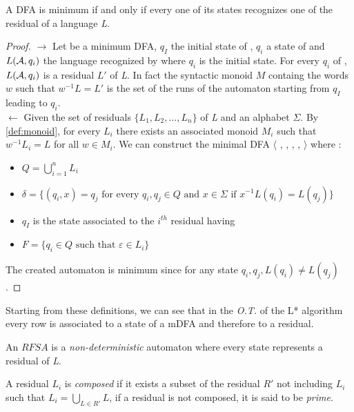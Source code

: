 \begin{theorem}
  A DFA is minimum if and only if every one of its states recognizes one of the residual of a language \textit{L}.
\end{theorem}

\begin{proof}
  $\rightarrow$ Let \automaton{} be a minimum DFA, $q_I$ the initial state of \automaton{}, $q_i$ a state of \automaton{} and $L(\mathcal{A}{}, q_i)$ the language recognized by \automaton{} where $q_i$ is the initial state. For every $q_i$ of \automaton{}, $L(\mathcal{A}{}, q_i)$ is a residual $L'$ of \textit{L}. In fact the syntactic monoid $M$ containg the words $w$ such that $w^{-1}L = L'$ is the set of the runs of the automaton starting from $q_I$ leading to $q_i$. \\
  $\leftarrow$ Given the set of residuals $\{L_1, L_2, \dots, L_n\}$ of \textit{L} and an alphabet $\Sigma$. By \cref{def:monoid}, for every $L_i$ there exists an associated monoid $M_i$ such that $w^{-1}L_i = L$ for all $w \in M_i$. We can construct the minimal DFA $\langle$ \alphabet{}, \states{}, \transition{}, \qzero{}, \qend{} $\rangle$ where :
  \begin{itemize}
    \item $Q = \bigcup_{i=1}^{n}L_i$
    \item $\delta = \{(q_i, x) = q_j \text{ for every } q_i, q_j \in Q \text{ and } x \in \Sigma \text{ if } x^{-1}L(q_i) = L(q_j)\}$
    \item $q_I$ is the state associated to the $i^{th}$ residual having
    \item $F = \{q_i \in Q \text{ such that } \varepsilon \in L_i\}$
  \end{itemize}
  The created automaton is minimum since for any state $q_i, q_j, L(q_i) \neq L(q_j)$.
\end{proof}

Starting from these definitions, we can see that in the \textit{O.T.} of the L* algorithm every row is associated to a state of a mDFA and therefore to a residual.

\begin{definition}
  An $RFSA$ is a \textit{non-deterministic} automaton where every state represents a residual of \textit{L}.
\end{definition}

\begin{definition}
  A residual $L_i$ is \textit{composed} if it exists a subset of the residual $R'$ not including $L_i$ such that $L_i = \bigcup_{L \in R'}L$, if a residual is not composed, it is said to be \textit{prime}.
\end{definition}


